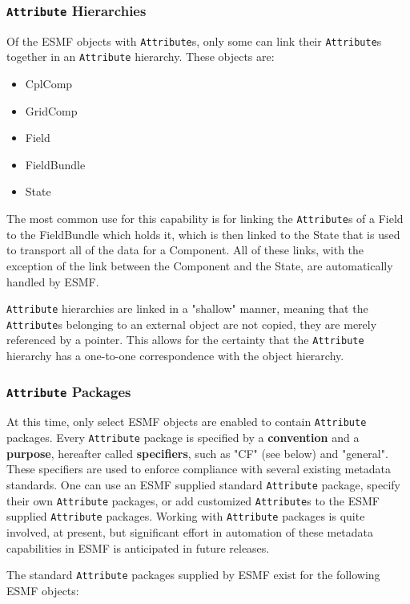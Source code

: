 \subsubsection{{\tt Attribute} Hierarchies}

Of the ESMF objects with {\tt Attribute}s, only some can link their {\tt Attribute}s together in an {\tt Attribute} hierarchy.  These objects are:

\begin{itemize}
\item CplComp
\item GridComp
\item Field
\item FieldBundle
\item State
\end{itemize}

The most common use for this capability is for linking the {\tt Attribute}s of a Field to the FieldBundle which holds it, which is then linked to the State that is used to transport all of the data for a Component.  All of these links, with the exception of the link between the Component and the State, are automatically handled by ESMF.  

{\tt Attribute} hierarchies are linked in a "shallow" manner, meaning that the {\tt Attribute}s belonging to an external object are not copied, they are merely referenced by a pointer.  This allows for the certainty that the {\tt Attribute} hierarchy has a one-to-one correspondence with the object hierarchy.  

\subsubsection{{\tt Attribute} Packages}

At this time, only select ESMF objects are enabled to contain {\tt Attribute} packages.  Every {\tt Attribute} package is specified by a {\bf convention} and a {\bf purpose}, hereafter called {\bf specifiers}, such as "CF" (see below) and "general".  These specifiers are used to enforce compliance with several existing metadata standards.  One can use an ESMF supplied standard {\tt Attribute} package, specify their own {\tt Attribute} packages, or add customized {\tt Attribute}s to the ESMF supplied {\tt Attribute} packages.  Working with {\tt Attribute} packages is quite involved, at present, but significant effort in automation of these metadata capabilities in ESMF is anticipated in future releases. 

The standard {\tt Attribute} packages supplied by ESMF exist for the following ESMF objects:

